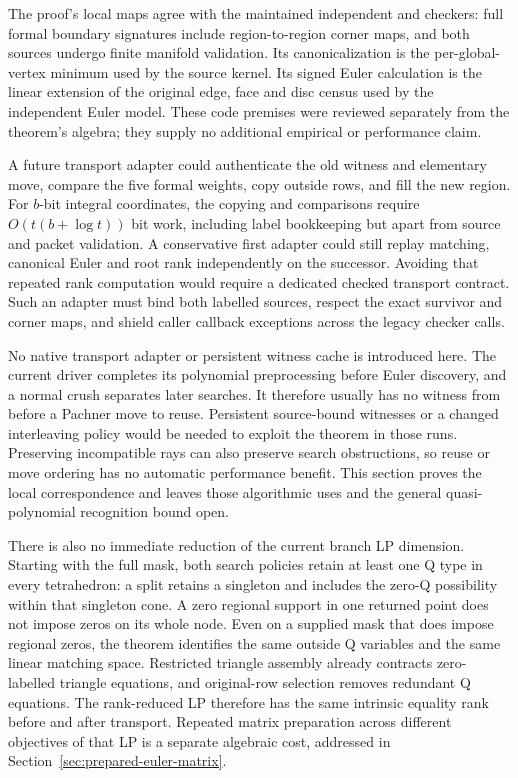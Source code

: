 The proof's local maps agree with the maintained independent
 and  checkers: full formal
boundary signatures include region-to-region corner maps, and both
sources undergo finite manifold validation.  Its canonicalization is
the per-global-vertex minimum used by the source kernel.  Its signed
Euler calculation is the linear extension of the original edge, face
and disc census used by the independent Euler model.  These code
premises were reviewed separately from the theorem's algebra; they
supply no additional empirical or performance claim.

A future transport adapter could authenticate the old witness and
elementary move, compare the five formal weights, copy outside rows,
and fill the new region.  For $b$-bit integral coordinates, the copying
and comparisons require $O(t(b+\log t))$ bit work, including label
bookkeeping but apart from source and packet
validation.  A conservative first adapter could still replay matching,
canonical Euler and root rank independently on the successor.  Avoiding
that repeated rank computation would require a dedicated checked
transport contract.  Such an adapter must bind both labelled sources,
respect the exact survivor and corner maps, and shield caller callback
exceptions across the legacy checker calls.

No native transport adapter or persistent witness cache is introduced
here.  The current driver completes its polynomial preprocessing before
Euler discovery, and a normal crush separates later searches.  It
therefore usually has no witness from before a Pachner move to reuse.
Persistent source-bound witnesses or a changed interleaving policy
would be needed to exploit the theorem in those runs.  Preserving
incompatible rays can also preserve search obstructions, so reuse or
move ordering has no automatic performance benefit.  This section
proves the local correspondence and leaves those algorithmic uses and
the general quasi-polynomial recognition bound open.

There is also no immediate reduction of the current branch LP dimension.
Starting with the full mask, both search policies retain at least one
Q type in every tetrahedron: a split retains a singleton and includes
the zero-Q possibility within that singleton cone.  A zero regional
support in one returned point does not impose zeros on its whole node.
Even on a supplied mask that does impose regional zeros, the theorem
identifies the same outside Q variables and the same linear matching
space.  Restricted triangle assembly already contracts zero-labelled
triangle equations, and original-row selection removes redundant Q
equations.  The rank-reduced LP therefore has the same intrinsic equality
rank before and after transport.  Repeated matrix preparation across
different objectives of that LP is a separate algebraic cost, addressed
in Section~\ref{sec:prepared-euler-matrix}.
